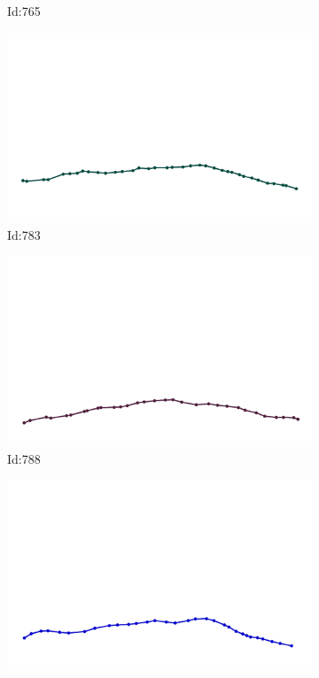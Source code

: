 \documentclass[12pt,twoside]{report}
\begin{document}
\begin{figure}
\begin{subfigure}[b]{0.20\textwidth}
\caption{Id:765}
\end{subfigure}
\begin{subfigure}[b]{0.20\textwidth}
\centering
\includegraphics[width=\textwidth]{../trajectories/783.png}
\caption{Id:783}
\end{subfigure}
\begin{subfigure}[b]{0.20\textwidth}
\centering
\includegraphics[width=\textwidth]{../trajectories/788.png}
\caption{Id:788}
\end{subfigure}
\begin{subfigure}[b]{0.20\textwidth}
\centering
\includegraphics[width=\textwidth]{../trajectories/812.png}

\end{subfigure}
\end{figure}
\end{document}
